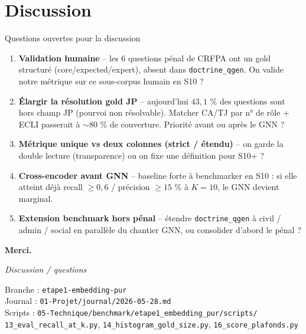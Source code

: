 \documentclass[aspectratio=169,10pt]{beamer}
\begin{document}
\section{Discussion}

\begin{frame}{Questions ouvertes pour la discussion}
  \footnotesize
  \begin{enumerate}\setlength\itemsep{0.5em}
    \item \textbf{Validation humaine} -- les 6 questions pénal de CRFPA ont un gold structuré
    (core/expected/expert), absent dans \texttt{doctrine\_qgen}. On valide notre métrique sur ce
    sous-corpus humain en S10 ?

    \item \textbf{Élargir la résolution gold JP} -- aujourd'hui $43{,}1$ \% des questions sont hors champ
    JP (pourvoi non résolvable). Matcher CA/TJ par n° de rôle + ECLI passerait à $\sim 80$ \% de couverture.
    Priorité avant ou après le GNN ?

    \item \textbf{Métrique unique vs deux colonnes (strict / étendu)} -- on garde la double lecture
    (transparence) ou on fixe une définition pour S10+ ?

    \item \textbf{Cross-encoder avant GNN} -- baseline forte à benchmarker en S10 : si elle atteint
    déjà recall $\geq 0{,}6$ / précision $\geq 15$ \% à $K{=}10$, le GNN devient marginal.

    \item \textbf{Extension benchmark hors pénal} -- étendre \texttt{doctrine\_qgen} à civil / admin /
    social en parallèle du chantier GNN, ou consolider d'abord le pénal ?
  \end{enumerate}
\end{frame}

\begin{frame}
  \begin{center}
    \vspace{2em}
    {\Large\textbf{Merci.}}
    \vspace{2em}

    \textit{Discussion / questions}

    \vspace{2em}
    \scriptsize
    Branche : \texttt{etape1-embedding-pur}\\
    Journal : \texttt{01-Projet/journal/2026-05-28.md}\\
    Scripts : \texttt{05-Technique/benchmark/etape1\_embedding\_pur/scripts/}\\
    \texttt{13\_eval\_recall\_at\_k.py}, \texttt{14\_histogram\_gold\_size.py}, \texttt{16\_score\_plafonds.py}
  \end{center}
\end{frame}
\end{document}
